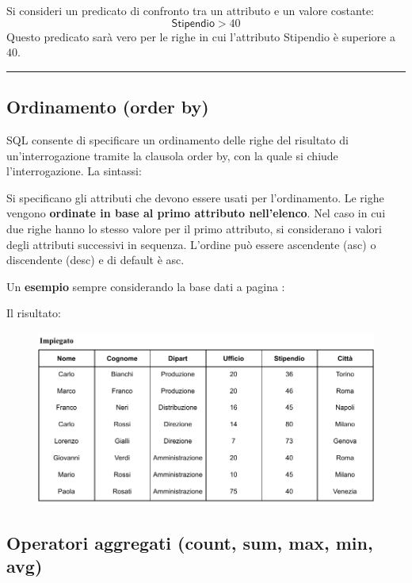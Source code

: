 \documentclass[a4paper]{article}
\newcommand{\longline}{\noindent\rule{\textwidth}{0.4pt}}
\begin{document}
	\noindent
	Si consideri un predicato di confronto tra un attributo e un valore costante:
	\begin{equation*}
		\textsf{Stipendio} > 40
	\end{equation*}
	Questo predicato sarà vero per le righe in cui l'attributo \textsf{Stipendio} è superiore a	$40$.
	
	\longline
	
	\subsection{Ordinamento (\textsf{order by})}
	
	SQL consente di specificare un ordinamento delle righe del risultato di un'interrogazione tramite la clausola \textsf{order by}, con la quale si chiude l'interrogazione. La sintassi:
	
	Si specificano gli attributi che devono essere usati per l'ordinamento. Le righe vengono \textbf{ordinate in base al primo attributo nell'elenco}. Nel caso in cui due righe hanno lo stesso valore per il primo attributo, si considerano i valori degli attributi successivi in sequenza. L'ordine può essere ascendente (\textsf{asc}) o discendente (\textsf{desc}) e di default è \textsf{asc}.\newline
	
	\noindent
	Un \textcolor{Green4}{\textbf{esempio}} sempre considerando la base dati a pagina \pageref{img: select dbms}:
	
	Il risultato:
	\begin{figure}[!htp]
		\centering
		\includegraphics[width=\textwidth]{img/order_by-ex1.pdf}
	\end{figure}\newpage
	
	\subsection{Operatori aggregati (\textsf{count}, \textsf{sum}, \textsf{max}, \textsf{min}, \textsf{avg})}
	
\end{document}
